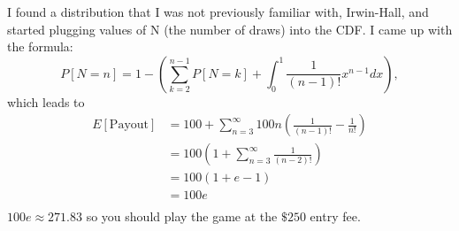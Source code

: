 \documentclass{article}
\begin{document}
\noindent I found a distribution that I was not previously familiar with, Irwin-Hall, and started plugging values of N (the number of draws) into the CDF. I came up with the formula:
    \begin{equation*}P[N=n] = 1 - \left(\sum\limits_{k=2}^{n-1}P[N=k]+\int_{0}^{1}\frac{1}{\left(n-1\right)!}x^{n-1}dx\right),\end{equation*}
which leads to
\begin{equation*}
    \begin{split}
        E[\text{Payout}]&=100+\sum\limits_{n=3}^{\infty}100n\left(\frac{1}{\left(n-1\right)!}-\frac{1}{n!}\right)\\
                          &=100\left(1+\sum\limits_{n=3}^{\infty}\frac{1}{\left(n-2\right)!}\right)\\
                          &=100\left(1+e-1\right)\\
                          &=100e\\
    \end{split}
\end{equation*}
$100e\approx271.83$ so you should play the game at the $\$250$ entry fee.
\end{document}
